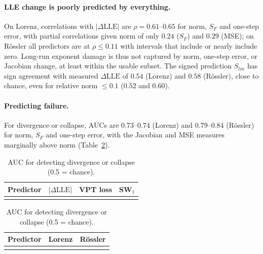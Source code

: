 \documentclass[11pt]{article}
\newcommand{\LLE}{\mathrm{LLE}}
\newcommand{\relnorm}{\|\Delta\theta\|/\|\theta\|}
\begin{document}
\paragraph{LLE change is poorly predicted by everything.} On Lorenz, correlations with $|\Delta\LLE|$ are $\rho=0.61$--$0.65$ for norm, $S_F$ and one-step error, with partial correlations given norm of only $0.24$ ($S_F$) and $0.29$ (MSE); on R\"ossler all predictors are at $\rho\le0.11$ with intervals that include or nearly include zero. Long-run exponent damage is thus not captured by norm, one-step error, or Jacobian change, at least within the usable subset. The signed prediction $S_{lin}$ has sign agreement with measured $\Delta\LLE$ of $0.54$ (Lorenz) and $0.58$ (R\"ossler), close to chance, even for relative norm $\le0.1$ ($0.52$ and $0.60$).

\paragraph{Predicting failure.} For divergence or collapse, AUCs are $0.73$--$0.74$ (Lorenz) and $0.79$--$0.84$ (R\"ossler) for norm, $S_F$ and one-step error, with the Jacobian and MSE measures marginally above norm (Table~\ref{tab:auc}).

\begin{table}[t]
\centering\small
\begin{minipage}[t]{0.48\textwidth}\centering
\caption{Partial Spearman $\rho$ given $\relnorm$ (mean over parents).}\label{tab:partial}
\begin{tabular}{lccc}
\toprule
Predictor & $|\Delta\LLE|$ & VPT loss & SW$_1$\\
\midrule
\\
\bottomrule
\end{tabular}
\end{minipage}\hfill
\begin{minipage}[t]{0.48\textwidth}\centering
\caption{AUC for detecting divergence or collapse (0.5 = chance).}\label{tab:auc}
\begin{tabular}{lcc}
\toprule
Predictor & Lorenz & R\"ossler\\
\midrule
\\
\bottomrule
\end{tabular}
\end{minipage}
\end{table}
\end{document}
